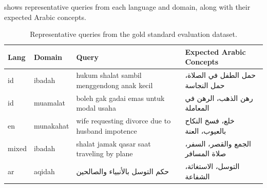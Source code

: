 \documentclass[preprint,12pt,authoryear]{elsarticle}
\begin{document}
 shows representative queries from each language and domain, along with their expected Arabic concepts.

\begin{table}[t]
\centering
\caption{Representative queries from the gold standard evaluation dataset.}
\label{tab:query-examples}
\small
\begin{tabular}{llp{5cm}p{4.5cm}}
\toprule
Lang & Domain & Query & Expected Arabic Concepts \\
\midrule
id & ibadah & hukum shalat sambil menggendong anak kecil & حمل الطفل في الصلاة، حمل النجاسة \\
id & muamalat & boleh gak gadai emas untuk modal usaha & رهن الذهب، الرهن في المعاملة \\
en & munakahat & wife requesting divorce due to husband impotence & خلع، فسخ النكاح بالعيوب، العنة \\
mixed & ibadah & shalat jamak qasar saat traveling by plane & الجمع والقصر، السفر، صلاة المسافر \\
ar & aqidah & حكم التوسل بالأنبياء والصالحين & التوسل، الاستغاثة، الشفاعة \\
\bottomrule
\end{tabular}
\end{table}
\end{document}
